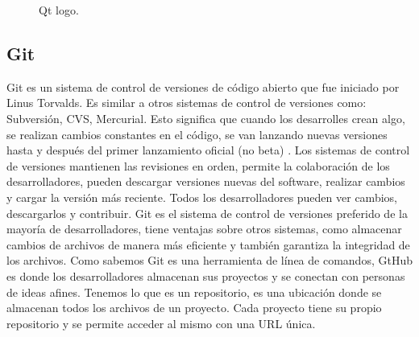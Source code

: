 \documentclass[conference]{IEEEtran}
\newcommand\tab[1][1cm]{\hspace*{#1}}
\begin{document}
    \begin{figure}[ht]
        \caption{Qt logo.}
        \label{figiconqt}
    \end{figure}
    
    \subsection{Git}
    Git es un sistema de control de versiones de código abierto que fue iniciado por Linus Torvalds. Es similar a otros sistemas de control de versiones como: Subversión, CVS, Mercurial. Esto significa que cuando los desarrolles crean algo, se realizan cambios constantes en el código, se van lanzando nuevas versiones hasta y después del primer lanzamiento oficial (no beta) \citep{github}.
    \newline
    \newline
    \tab[0.55cm] Los sistemas de control de versiones mantienen las revisiones en orden, permite la colaboración de los desarrolladores, pueden descargar versiones nuevas del software, realizar cambios y cargar la versión más reciente. Todos los desarrolladores pueden ver cambios, descargarlos y contribuir.
    \newline
    \newline
    \tab[0.55cm] Git es el sistema de control de versiones preferido de la mayoría de desarrolladores, tiene ventajas sobre otros sistemas, como almacenar cambios de archivos de manera más eficiente y también garantiza la integridad de los archivos.
    \newline
    \newline
    \tab[0.55cm] Como sabemos Git es una herramienta de línea de comandos, GtHub es donde los desarrolladores almacenan sus proyectos y se conectan con personas de ideas afines.
    \newline
    \newline
    \tab[0.55cm] Tenemos lo que es un repositorio, es una ubicación donde se almacenan todos los archivos de un proyecto. Cada proyecto tiene su propio repositorio y se permite acceder al mismo con una URL única.
\end{document}

